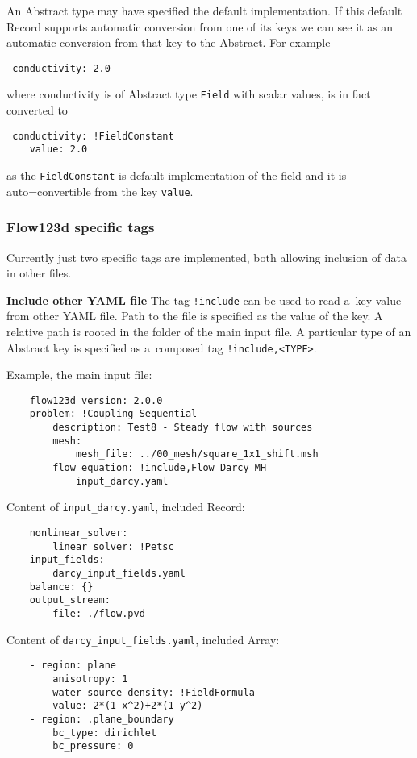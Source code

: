 An Abstract type may have specified the default implementation. If this default Record supports automatic conversion from one of its keys
we can see it as an automatic conversion from that key to the Abstract. For example
\begin{verbatim}
 conductivity: 2.0
\end{verbatim}
where conductivity is of Abstract type \verb'Field' with scalar values, is in fact converted to
\begin{verbatim}
 conductivity: !FieldConstant
    value: 2.0
\end{verbatim}
as the \verb'FieldConstant' is default implementation of the field and it is auto=convertible from the key \verb'value'. 

\subsubsection{Flow123d specific tags}
\label{sec:spec_tags}
Currently just two specific tags are implemented, both allowing inclusion of data in other files.

{\bf Include other YAML file} The tag \verb'!include' can be used to read a~key value from other YAML file.
Path to the file is specified as the value of the key. A relative path is rooted in the folder of the main input file.
A particular type of an Abstract key is specified as a~composed tag \verb'!include,<TYPE>'.

Example, the main input file:
\begin{verbatim}
    flow123d_version: 2.0.0
    problem: !Coupling_Sequential
        description: Test8 - Steady flow with sources
        mesh:
            mesh_file: ../00_mesh/square_1x1_shift.msh
        flow_equation: !include,Flow_Darcy_MH
            input_darcy.yaml
\end{verbatim}
Content of \verb'input_darcy.yaml', included Record:
\begin{verbatim}
    nonlinear_solver:
        linear_solver: !Petsc
    input_fields:
        darcy_input_fields.yaml
    balance: {}
    output_stream: 
        file: ./flow.pvd
\end{verbatim}
Content of \verb'darcy_input_fields.yaml', included Array:
\begin{verbatim}
    - region: plane
        anisotropy: 1
        water_source_density: !FieldFormula
        value: 2*(1-x^2)+2*(1-y^2)
    - region: .plane_boundary
        bc_type: dirichlet
        bc_pressure: 0    
\end{verbatim}

